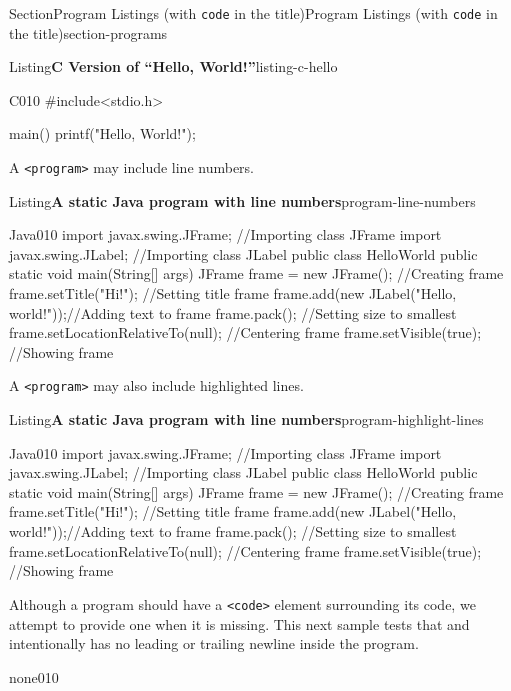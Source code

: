 \documentclass[twoside,10pt,]{article}
\newcommand{\mono}[1]{\texttt{#1}}
\numberwithin{equation}{section}
\begin{document}
\begin{sectionptx}{Section}{Program Listings (with \mono{code} in the title)}{}{Program Listings (with \mono{code} in the title)}{}{}{section-programs}
\begin{listingptx}{Listing}{\textbf{C Version of ``Hello, World!''}}{listing-c-hello}{}
\begin{program}{C}{0}{1}{0}
#include<stdio.h>

main()
{
    printf("Hello, World!");
}
\end{program}
\end{listingptx}%
A \mono{<program>} may include line numbers.%
\begin{listingptx}{Listing}{\textbf{A static Java program with line numbers}}{program-line-numbers}{}%
\begin{programnumbered}{Java}{0}{1}{0}
import javax.swing.JFrame;  //Importing class JFrame
import javax.swing.JLabel;  //Importing class JLabel
public class HelloWorld {
    public static void main(String[] args) {
        JFrame frame = new JFrame();           //Creating frame
        frame.setTitle("Hi!");                 //Setting title frame
        frame.add(new JLabel("Hello, world!"));//Adding text to frame
        frame.pack();                          //Setting size to smallest
        frame.setLocationRelativeTo(null);     //Centering frame
        frame.setVisible(true);                //Showing frame
    }
}
\end{programnumbered}
\end{listingptx}%
A \mono{<program>} may also include highlighted lines.%
\begin{listingptx}{Listing}{\textbf{A static Java program with line numbers}}{program-highlight-lines}{}%
\begin{programnumbered}{Java}{0}{1}{0}
import javax.swing.JFrame;  //Importing class JFrame
import javax.swing.JLabel;  //Importing class JLabel
public class HelloWorld {
    public static void main(String[] args) {
        JFrame frame = new JFrame();           //Creating frame
        frame.setTitle("Hi!");                 //Setting title frame
        frame.add(new JLabel("Hello, world!"));//Adding text to frame
        frame.pack();                          //Setting size to smallest
        frame.setLocationRelativeTo(null);     //Centering frame
        frame.setVisible(true);                //Showing frame
    }
}
\end{programnumbered}
\end{listingptx}%
Although a program should have a \mono{<code>} element surrounding its code, we attempt to provide one when it is missing. This next sample tests that and intentionally has no leading or trailing newline inside the program.%
\begin{program}{none}{0}{1}{0}


\end{program}
\end{sectionptx}
\end{document}
